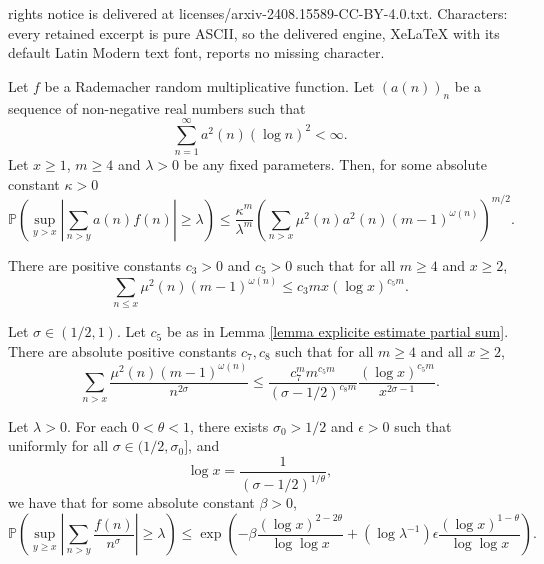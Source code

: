 \documentclass[10pt,a4paper]{amsart}
\newcommand{\PP}{\mathbb{P}}
\begin{document}
rights notice is delivered at licenses/arxiv-2408.15589-CC-BY-4.0.txt. Characters: every retained excerpt is pure ASCII, so the delivered engine, XeLaTeX with its default Latin Modern text font, reports no missing character.
\begin{lemma}\label{lemma maximal inequality}
Let $f$ be a Rademacher random multiplicative function. Let $(a(n))_n$ be a sequence of non-negative real numbers such that 
$$\sum_{n=1}^\infty a^2(n)(\log n)^2<\infty.$$
Let $x\geq 1$, $m\geq 4$ and $\lambda>0$ be any fixed parameters. Then, for some absolute constant $\kappa>0$
$$\PP\left(\sup_{y>x}\left|\sum_{n>y} a(n)f(n)\right|\geq \lambda\right)\leq \frac{\kappa^{m}}{\lambda^m}\left(\sum_{n>x}\mu^2(n)a^2(n)(m-1)^{\omega(n)}\right)^{m/2}.$$
\end{lemma}

\begin{lemma}\label{lemma explicite estimate partial sum} There are positive constants $c_3>0$ and $c_5>0$ such that for all $m\geq 4$ and $x\geq 2$,
\begin{equation}\label{equation upper bound 3 omega n}
\sum_{n\leq x}\mu^2(n)(m-1)^{\omega(n)}\leq c_3mx(\log x)^{c_5m}.
\end{equation}
\end{lemma}

\begin{lemma}\label{lemma evaluacao da serie} Let $\sigma\in(1/2,1)$. Let $c_5$ be as in Lemma \ref{lemma explicite estimate partial sum}. There are absolute positive constants $c_7,c_8$ such that for all $m\geq 4$ and all $x\geq2$, 
$$\sum_{n>x}\frac{\mu^2(n)(m-1)^{\omega(n)}}{n^{2\sigma}}\leq \frac{c_7^m m^{c_5m}}{(\sigma-1/2)^{c_8m}}\frac{(\log x)^{c_5m}}{x^{2\sigma-1}}.$$
\end{lemma}

\begin{lemma}\label{lemma estimate for the sup} Let $\lambda>0$. For each $0<\theta<1$, there exists $\sigma_0>1/2$ and $\epsilon>0$ such that uniformly for all $\sigma\in(1/2,\sigma_0]$, and
$$\log x = \frac{1}{(\sigma-1/2)^{1/\theta}},$$ 
we have that for some absolute constant $\beta>0$,
$$\PP\left(\sup_{y\geq x}\left|\sum_{n>y}\frac{f(n)}{n^\sigma}\right|\geq \lambda\right)\leq \exp\left(-\beta \frac{(\log x)^{2-2\theta}}{\log\log x}+(\log\lambda ^{-1})\epsilon\frac{(\log x)^{1-\theta}}{\log\log x}\right).$$
\end{lemma}
\end{document}
